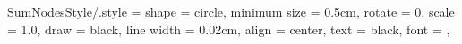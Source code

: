 
\tikzset
{
	SumNodesStyle/.style =
	{
		shape			= circle,				%
		minimum size	= 0.5cm,				%
		rotate			= 0,					%
		scale			= 1.0,					%
		draw			= black,				%
		line width		= 0.02cm,				%
		align			= center,				%
		text			= black,				%
		font			= \normalsize\normalfont,	%
	}
}

